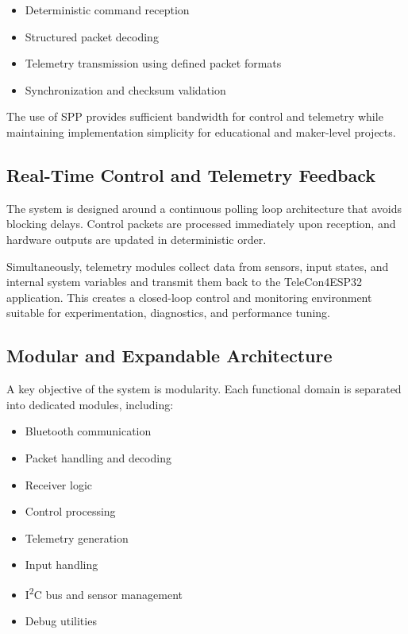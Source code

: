 \begin{itemize}
	\item Deterministic command reception
	\item Structured packet decoding
	\item Telemetry transmission using defined packet formats
	\item Synchronization and checksum validation
\end{itemize}

The use of SPP provides sufficient bandwidth for control and telemetry while maintaining implementation simplicity for educational and maker-level projects.

\subsection{Real-Time Control and Telemetry Feedback}

The system is designed around a continuous polling loop architecture that avoids blocking delays. Control packets are processed immediately upon reception, and hardware outputs are updated in deterministic order.

Simultaneously, telemetry modules collect data from sensors, input states, and internal system variables and transmit them back to the TeleCon4ESP32 application. This creates a closed-loop control and monitoring environment suitable for experimentation, diagnostics, and performance tuning.

\subsection{Modular and Expandable Architecture}

A key objective of the system is modularity. Each functional domain is separated into dedicated modules, including:

\begin{itemize}
	\item Bluetooth communication
	\item Packet handling and decoding
	\item Receiver logic
	\item Control processing
	\item Telemetry generation
	\item Input handling
	\item I\textsuperscript{2}C bus and sensor management
	\item Debug utilities
\end{itemize}


